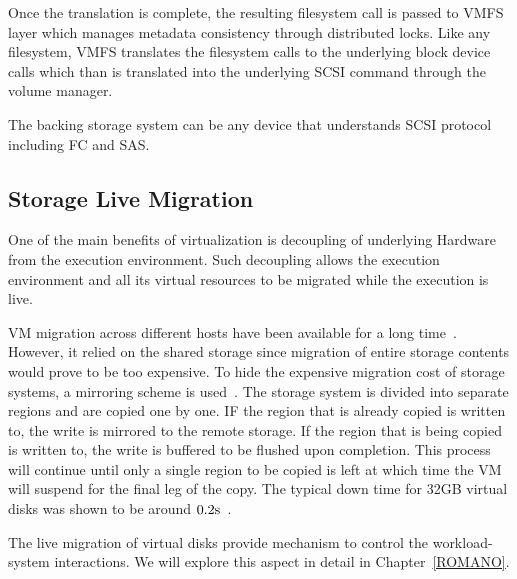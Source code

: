 Once the translation is complete, the resulting filesystem call is passed to VMFS layer which manages metadata consistency through distributed locks. 
Like any filesystem, VMFS translates the filesystem calls to the underlying block device calls which than is translated into the underlying SCSI command through the volume manager. 

The backing storage system can be any device that understands SCSI protocol including FC and SAS. 

\subsection{Storage Live Migration}
One of the main benefits of virtualization is decoupling of underlying Hardware from the execution environment. 
Such decoupling allows the execution environment and all its virtual resources to be migrated while the execution is live. 

VM migration across different hosts have been available for a long time~\cite{clark:2005}.
However, it relied on the shared storage since migration of entire storage contents would prove to be too expensive.
To hide the expensive migration cost of storage systems, a mirroring scheme is used~\cite{mashtizadeh:2011}.
The storage system is divided into separate regions and are copied one by one. IF the region that is already copied is written to, the write is mirrored to the remote storage. 
If the region that is being copied is written to, the write is buffered to be flushed upon completion. 
This process will continue until only a single region to be copied is left at which time the VM will suspend for the final leg of the copy. 
The typical down time for 32GB virtual disks was shown to be around $0.2{\mathrm{s}}$~\cite{mashtizadeh:2011}.

The live migration of virtual disks provide mechanism to control the workload-system interactions.
We will explore this aspect in detail in Chapter~\ref{ROMANO}.
